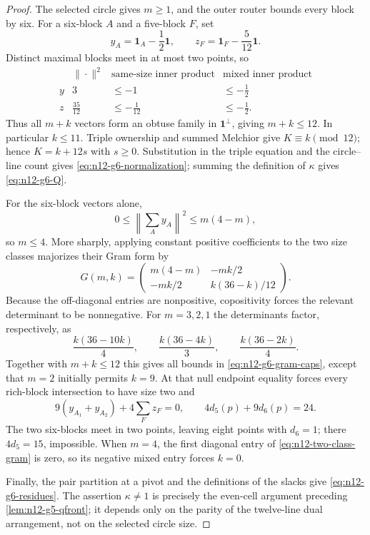 \begin{proof}
The selected circle gives $m\ge1$, and the outer router bounds every block
by six.  For a six-block $A$ and a five-block $F$, set
\[
y_A=\mathbf1_A-\frac12\mathbf1,\qquad
z_F=\mathbf1_F-\frac5{12}\mathbf1.
\]
Distinct maximal blocks meet in at most two points, so
\[
\begin{array}{c|ccc}
&\|\cdot\|^2&\text{same-size inner product}&
 \text{mixed inner product}\\ \hline
y&3&\le-1&\le-\frac12\\
z&\frac{35}{12}&\le-\frac1{12}&\le-\frac12.
\end{array}
\]
Thus all $m+k$ vectors form an obtuse family in $\mathbf1^\perp$, giving
$m+k\le12$.  In particular $k\le11$.  Triple ownership and summed
Melchior give $K\equiv k\pmod {12}$; hence
$K=k+12s$ with $s\ge0$.  Substitution in the triple equation and the
circle--line count gives \eqref{eq:n12-g6-normalization}; summing the
definition of $\kappa$ gives \eqref{eq:n12-g6-Q}.

For the six-block vectors alone,
\[
0\le\left\|\sum_Ay_A\right\|^2\le m(4-m),
\]
so $m\le4$.  More sharply, applying constant positive coefficients to the
two size classes majorizes their Gram form by
\begin{equation}\label{eq:n12-two-class-gram}
G(m,k)=
\begin{pmatrix}
m(4-m)&-mk/2\\
-mk/2&k(36-k)/12
\end{pmatrix}.
\end{equation}
Because the off-diagonal entries are nonpositive, copositivity forces the
relevant determinant to be nonnegative.  For $m=3,2,1$ the determinants
factor, respectively, as
\[
 \frac{k(36-10k)}4,\qquad
 \frac{k(36-4k)}3,\qquad
 \frac{k(36-2k)}4.
\]
Together with $m+k\le12$ this gives all bounds in
\eqref{eq:n12-g6-gram-caps}, except that $m=2$ initially permits $k=9$.
At that null endpoint equality forces every rich-block intersection to
have size two and
\[
 9(y_{A_1}+y_{A_2})+4\sum_Fz_F=0,\qquad
 4d_5(p)+9d_6(p)=24.
\]
The two six-blocks meet in two points, leaving eight points with $d_6=1$;
there $4d_5=15$, impossible.  When $m=4$, the first diagonal entry of
\eqref{eq:n12-two-class-gram} is zero, so its negative mixed entry forces
$k=0$.

Finally, the pair partition at a pivot and the definitions of the slacks
give \eqref{eq:n12-g6-residues}.  The assertion $\kappa\ne1$ is precisely
the even-cell argument preceding \cref{lem:n12-g5-qfront}; it depends only
on the parity of the twelve-line dual arrangement, not on the selected
circle size.
\end{proof}


